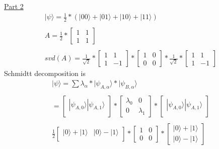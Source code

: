 \documentclass[a4paper,12pt]{article}
\begin{document}
\begin{enumerate}[label=(\alph*)]
\underline{Part 2}
\begin{gather*}
    |\psi\rangle = \frac{1}{2}*(|00\rangle + |01\rangle + |10\rangle+ |11\rangle)\\~\\
     A  =  \frac{1}{2}*  \begin{bmatrix}
1 & 1 \\
1 & 1
\end{bmatrix}\\~\\
svd(A) =\frac{1}{\sqrt{2}}* \begin{bmatrix}
1 & 1 \\
1 & -1
\end{bmatrix} * \begin{bmatrix}
1 & 0 \\
0 & 0
\end{bmatrix} * \frac{1}{\sqrt{2}} *  \begin{bmatrix}
1 & 1 \\
1 & -1
\end{bmatrix}
\end{gather*}
Schmidtt decomposition is 
\begin{gather*}
    |\psi\rangle = \sum \lambda_\alpha * |\psi_{A,\alpha}\rangle * |\psi_{B,\alpha}\rangle \\~\\
    = \begin{bmatrix}
|\psi_{A,0}\rangle |\psi_{A,1}\rangle \\
\end{bmatrix} * 
\begin{bmatrix}
\lambda_0 & 0 \\
 0 & \lambda_1
\end{bmatrix} *
\begin{bmatrix}
|\psi_{A,0}\rangle |\psi_{A,1}\rangle \\
\end{bmatrix} \\~\\
\frac{1}{2}\begin{bmatrix}
|0\rangle + |1\rangle & |0\rangle - |1\rangle  \\
\end{bmatrix} * 
\begin{bmatrix}
1 & 0 \\
 0 & 0
\end{bmatrix} *
\begin{bmatrix}
|0\rangle + |1\rangle  \\
|0\rangle - |1\rangle 
\end{bmatrix} \\~\\

\end{gather*}
\end{enumerate}
\end{document}
